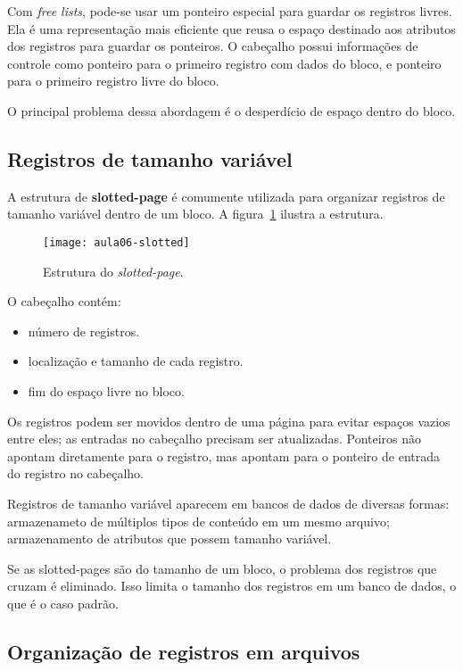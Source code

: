 Com \emph{free lists}, pode-se usar um ponteiro especial para guardar os registros livres.
Ela é uma representação mais eficiente que reusa o espaço destinado
aos atributos dos registros para guardar os ponteiros.
O cabeçalho possui informações de controle como ponteiro para o primeiro registro
com dados do bloco, e ponteiro para o primeiro registro livre do bloco.

O principal problema dessa abordagem é o desperdício de espaço dentro do bloco.

\subsection{Registros de tamanho variável}

A estrutura de \textbf{slotted-page} é comumente utilizada para organizar
registros de tamanho variável dentro de um bloco.
A figura~\ref{aula06:fig:slotted} ilustra a estrutura.
%
\begin{figure}[!htb]
\centering
\texttt{[image: aula06-slotted]}
\caption{Estrutura do \emph{slotted-page}.}
\label{aula06:fig:slotted}
\end{figure}
O cabeçalho contém:
\begin{itemize}
\item número de registros.
\item localização e tamanho de cada registro.
\item fim do espaço livre no bloco.
\end{itemize}
Os registros podem ser movidos dentro de uma página para evitar espaços vazios
entre eles; as entradas no cabeçalho precisam ser atualizadas.
Ponteiros não apontam diretamente para o registro, mas apontam 
para o ponteiro de entrada do registro no cabeçalho.

Registros de tamanho variável aparecem em bancos de dados de diversas formas:
armazenameto de múltiplos tipos de conteúdo em um mesmo arquivo;
armazenamento de atributos que possem tamanho variável.

Se as slotted-pages são do tamanho de um bloco, o problema dos registros que cruzam é eliminado.
Isso limita o tamanho dos registros em um banco de dados, o que é o caso padrão.

\subsection{Organização de registros em arquivos}

